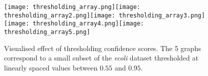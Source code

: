 \begin{figure}
\texttt{[image: thresholding\_array.png]}\texttt{[image: thresholding\_array2.png]}\texttt{[image: thresholding\_array3.png]}\texttt{[image: thresholding\_array4.png]}\texttt{[image: thresholding\_array5.png]}
\caption{Visualised effect of thresholding confidence scores.
The 5 graphs correspond to a small subset of the \textsl{ecoli} dataset thresholded at linearly spaced values between $0.55$ and $0.95$.}
\label{fig:thresholding_array}
\end{figure}
